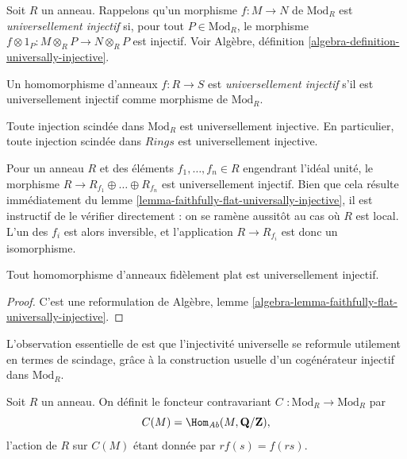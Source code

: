 \noindent
Soit $R$ un anneau. Rappelons qu'un morphisme $f : M \to N$ de $\text{Mod}_R$
est {\it universellement injectif} si, pour tout $P \in \text{Mod}_R$,
le morphisme $f \otimes 1_P: M \otimes_R P \to N \otimes_R P$ est injectif.
Voir Algèbre, définition \ref{algebra-definition-universally-injective}.

\begin{definition}
\label{definition-universally-injective}
Un homomorphisme d'anneaux $f: R \to S$ est {\it universellement injectif}
s'il est universellement injectif comme morphisme de $\text{Mod}_R$.
\end{definition}

\begin{example}
\label{example-split-injection-universally-injective}
Toute injection scindée dans $\text{Mod}_R$ est universellement injective.
En particulier, toute injection scindée dans $\textit{Rings}$
est universellement injective.
\end{example}

\begin{example}
\label{example-cover-universally-injective}
Pour un anneau $R$ et des éléments $f_1, \ldots, f_n \in R$ engendrant l'idéal
unité, le morphisme $R \to R_{f_1} \oplus \ldots \oplus R_{f_n}$
est universellement injectif. Bien que cela résulte immédiatement du
lemme \ref{lemma-faithfully-flat-universally-injective},
il est instructif de le vérifier directement : on se ramène aussitôt
au cas où $R$ est local. L'un des $f_i$ est alors inversible,
et l'application $R \to R_{f_i}$ est donc un isomorphisme.
\end{example}

\begin{lemma}
\label{lemma-faithfully-flat-universally-injective}
Tout homomorphisme d'anneaux fidèlement plat est universellement injectif.
\end{lemma}

\begin{proof}
C'est une reformulation de
Algèbre, lemme \ref{algebra-lemma-faithfully-flat-universally-injective}.
\end{proof}

\noindent
L'observation essentielle de \cite{mesablishvili1} est que l'injectivité
universelle se reformule utilement en termes de scindage, grâce à la
construction usuelle d'un cogénérateur injectif dans $\text{Mod}_R$.

\begin{definition}
\label{definition-C}
Soit $R$ un anneau. On définit le foncteur contravariant
{\it $C$} $ : \text{Mod}_R \to \text{Mod}_R$ par
$$
C(M) = \Hom_{\textit{Ab}}(M, \mathbf{Q}/\mathbf{Z}),
$$
l'action de $R$ sur $C(M)$ étant donnée par $rf(s) = f(rs)$.
\end{definition}

